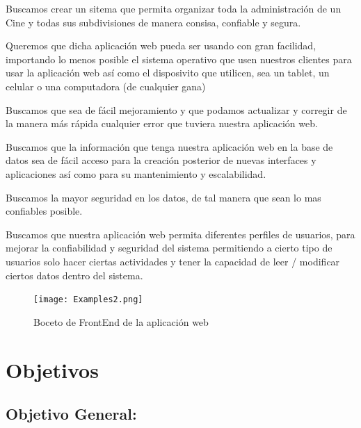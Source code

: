 \documentclass[12pt, fleqn]{report}                             %
\begin{document}
        Buscamos crear un sitema que permita organizar toda la administración de un Cine y todas
        sus subdivisiones de manera consisa, confiable y segura.

        Queremos que dicha aplicación web pueda ser usando con gran facilidad, importando lo menos posible
        el sistema operativo que usen nuestros clientes para usar la aplicación web así como el
        disposivito que utilicen, sea un tablet, un celular o una computadora (de cualquier gana)

        Buscamos que sea de fácil mejoramiento y que podamos actualizar y corregir de la manera más rápida
        cualquier error que tuviera nuestra aplicación web.

        Buscamos que la información que tenga nuestra aplicación web en la base de datos sea de fácil acceso
        para la creación posterior de nuevas interfaces y aplicaciones así como para su mantenimiento
        y escalabilidad.

        Buscamos la mayor seguridad en los datos, de tal manera que sean lo mas confiables posible.

        Buscamos que nuestra aplicación web permita diferentes perfiles de usuarios, para mejorar la confiabilidad
        y seguridad del sistema permitiendo a cierto tipo de usuarios solo hacer ciertas actividades y 
        tener la capacidad de leer / modificar ciertos datos dentro del sistema.



        \begin{figure}[h!]
            \centering
            \texttt{[image: Examples2.png]}
            \caption{Boceto de FrontEnd de la aplicación web}
        \end{figure}




    \clearpage
    \section{Objetivos}


        \subsection{Objetivo General:}
\end{document}
